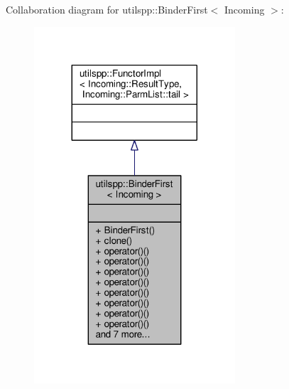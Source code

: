 Collaboration diagram for utilspp\-:\-:Binder\-First$<$ Incoming $>$\-:\nopagebreak
\begin{figure}[H]
\begin{center}
\leavevmode
\includegraphics[width=212pt]{classutilspp_1_1BinderFirst__coll__graph}
\end{center}
\end{figure}
